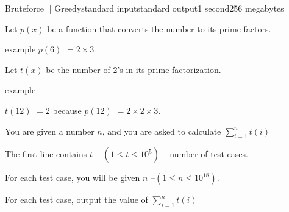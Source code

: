 \begin{problem}{Bruteforce || Greedy}{standard input}{standard output}{1 second}{256 megabytes}

Let $p(x)$ be a function that converts the number to its prime factors.

example
$p(6)$ $ = 2 \times 3$

Let $t(x)$ be the number of 2's in its prime factorization.

example 

$t(12)$ $= 2$ because $ p(12) $ $ = 2 \times 2 \times 3$.

You are given a number $n$, and you are asked to calculate ${\sum_{i = 1}^n t(i)}$

\InputFile
The first line contains $t$ -- $(1 \le t \le 10^5)$ -- number of test cases.

For each test case, you will be given $n$ --$(1\le n \le 10^{18})$.

\OutputFile
For each test case, output the value of ${\sum_{i = 1}^n t(i)}$

\Example

\begin{example}
%
\end{example}

\end{problem}

